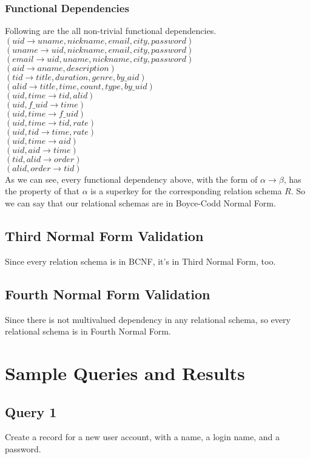 \documentclass[letter, 12pt]{report}
\begin{document}
	\subsubsection{Functional Dependencies}
	Following are the all non-trivial functional dependencies.\\
	$(uid\to uname, nickname, email, city, password)$\\
	$(uname\to uid, nickname, email, city, password)$\\
	$(email\to uid, uname ,nickname, city, password)$\\
	$(aid\to aname, description)$\\
	$(tid\to title, duration, genre, by\_aid)$\\
	$(alid\to title, time, count, type, by\_uid)$\\
	$(uid, time\to tid, alid)$\\
	$(uid, f\_uid\to time)$\\
	$(uid, time\to f\_uid)$\\
	$(uid, time\to tid, rate)$\\
	$(uid, tid\to time, rate)$\\
	$(uid, time\to aid)$\\
	$(uid, aid\to time)$\\
	$(tid, alid\to order)$\\
	$(alid, order\to tid)$\\
	As we can see, every functional dependency above, with the form of $\alpha \to \beta$, has the property of that $\alpha$ is a superkey for the corresponding relation schema $R$. So we can say that our relational schemas are in Boyce-Codd Normal Form.
	
	\subsection{Third Normal Form Validation}
	Since every relation schema is in BCNF, it's in Third Normal Form, too.
	\subsection{Fourth Normal Form Validation}
	Since there is not multivalued dependency in any relational schema, so every relational schema is in Fourth Normal Form.
	

	\section{Sample Queries and Results}
	\subsection{Query 1}
	Create a record for a new user account, with a name, a login name, and a password.
\end{document}

